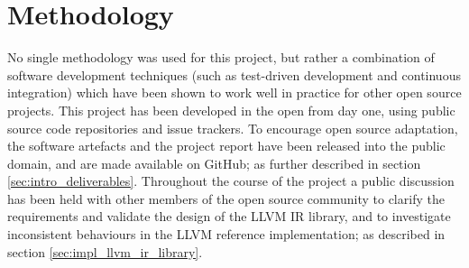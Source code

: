

\section{Methodology}
\label{sec:methodology}

No single methodology was used for this project, but rather a combination of software development techniques (such as test-driven development and continuous integration) which have been shown to work well in practice for other open source projects. This project has been developed in the open from day one, using public source code repositories and issue trackers. To encourage open source adaptation, the software artefacts and the project report have been released into the public domain, and are made available on GitHub; as further described in section \ref{sec:intro_deliverables}. Throughout the course of the project a public discussion has been held with other members of the open source community to clarify the requirements and validate the design of the LLVM IR library, and to investigate inconsistent behaviours in the LLVM reference implementation; as described in section \ref{sec:impl_llvm_ir_library}.





